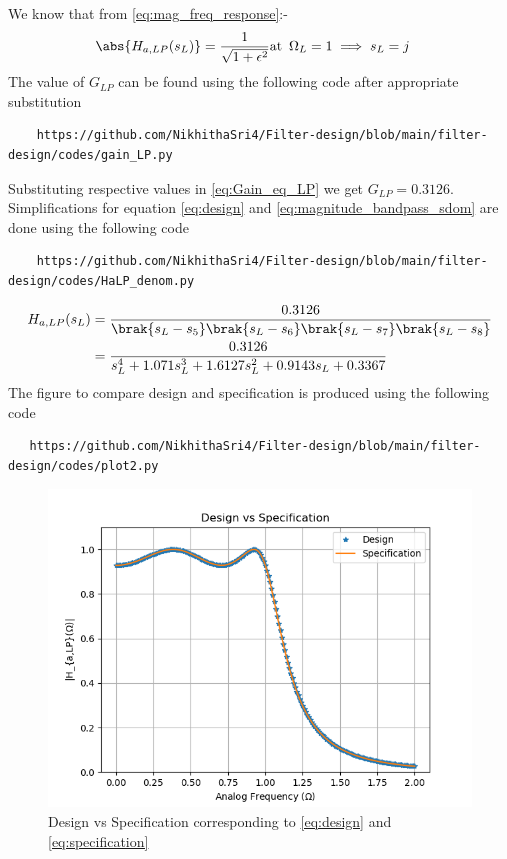\documentclass{article}
\begin{document}
\begin{enumerate}
We know that from \eqref{eq:mag_freq_response}:-
\begin{align}
    \abs{ H_{a,LP}(s_L)} &= \frac{1}{\sqrt{1+\epsilon^2}} \text{at} \hspace{5pt} \Omega_{L}=1 \implies s_{L} = j \label{eq:Gain_eq_LP} 
\end{align}
The value of $G_{LP}$ can be found using the following code after appropriate substitution
\begin{lstlisting}
    https://github.com/NikhithaSri4/Filter-design/blob/main/filter-design/codes/gain_LP.py
\end{lstlisting}
Substituting respective values in \eqref{eq:Gain_eq_LP} we get $G_{LP}=0.3126$.
Simplifications for equation \eqref{eq:design} and \eqref{eq:magnitude_bandpass_sdom} are done using the following code
\begin{lstlisting}
    https://github.com/NikhithaSri4/Filter-design/blob/main/filter-design/codes/HaLP_denom.py
\end{lstlisting}
\begin{align}
     H_{a,LP}(s_L) &= \frac{0.3126}{\brak{s_L-s_5}\brak{s_L-s_6}\brak{s_L-s_7}\brak{s_L-s_8}}\\
     &= \frac{0.3126}{s_{L}^4 + 1.071s_{L}^3 +1.6127s_{L}^2 + 0.9143s_{L} +0.3367}\label{eq:design}
\end{align}
The figure to compare design and specification is produced using the following code
\begin{lstlisting}
   https://github.com/NikhithaSri4/Filter-design/blob/main/filter-design/codes/plot2.py
\end{lstlisting}
\begin{figure}[H]
\centering
\includegraphics[width=1\columnwidth]{figs/Design_vs_Specification.png}
\caption{Design vs Specification corresponding to \eqref{eq:design} and \eqref{eq:specification}}
\label{fig:design_vs_specf}
\end{figure}


\end{enumerate}
\end{document}
